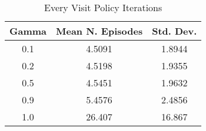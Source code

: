 \documentclass[letterpaper]{article} %
\begin{document}
\begin{itemize}
	    \begin{table}[htbp]
	    \caption{Every Visit Policy Iterations}
	    \label{tab:gamma}
	    \centering
	    \begin{tabular}{|c|c|c|}
	    \hline
	    Gamma & Mean N. Episodes   & Std. Dev. \\ \hline
	    0.1   & 4.5091             & 1.8944    \\ \hline
	    0.2   & 4.5198             & 1.9355    \\ \hline
	    0.5   & 4.5451             & 1.9632    \\ \hline
	    0.9   & 5.4576             & 2.4856    \\ \hline
	    1.0   & 26.407             & 16.867    \\ \hline
	    \end{tabular}
	    \end{table}

	\end{itemize}
\end{document}
